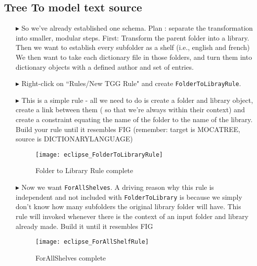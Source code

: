 \newpage
\hypertarget{treeToModel tex}{}
\subsection{Tree To model text source}
\texHeader

\begin{itemize}

\item[$\blacktriangleright$] So we've already established one schema. Plan : separate the transformation into smaller, modular steps. First: Transform the
parent folder into a library. Then we want to establish every subfolder as a shelf  (i.e., english and french) We then want to take each dictionary file in
those folders, and turn them into dictionary objects with a defined author and set of entries.

\item[$\blacktriangleright$] Right-click on ``Rules/New TGG Rule" and create \texttt{FolderToLibrayRule}.

\item[$\blacktriangleright$] This is a simple rule - all we need to do is create a folder and library object, create a link between them ( so that we're
always within their context) and create a constraint equating the name of the folder to the name of the library. Build your rule until it resembles FIG
(remember: target is MOCATREE, source is DICTIONARYLANGUAGE)

\begin{figure}[htbp]
\begin{center}
  \texttt{[image: eclipse\_FolderToLibraryRule]}
  \caption{Folder to Library Rule complete}
  \label{eclipse:FolderToLibraryRule}
\end{center}
\end{figure}

\item[$\blacktriangleright$] Now we want \texttt{ForAllShelves}. A driving reason why this rule is independent and not included with \texttt{FolderToLibrary} is
because we simply don't know how many subfolders the original library folder will have. This rule will invoked whenever there is the context of an input folder
and library already made. Build it until it resembles FIG

\begin{figure}[htbp]
\begin{center}
  \texttt{[image: eclipse\_ForAllShelfRule]}
  \caption{ForAllShelves complete}
  \label{eclipse:ForAllShelvesRule}
\end{center}
\end{figure}


\end{itemize}
